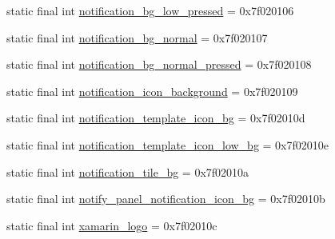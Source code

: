 \begin{CompactItemize}
\item 
static final int \hyperlink{classandroid_1_1support_1_1v7_1_1mediarouter_1_1_r_1_1drawable_5c6e82270631fb7b6baf29c77dc7ef75}{notification\_\-bg\_\-low\_\-pressed} = 0x7f020106
\item 
static final int \hyperlink{classandroid_1_1support_1_1v7_1_1mediarouter_1_1_r_1_1drawable_d57d0bc0bcd88fec47448c85cdb753ab}{notification\_\-bg\_\-normal} = 0x7f020107
\item 
static final int \hyperlink{classandroid_1_1support_1_1v7_1_1mediarouter_1_1_r_1_1drawable_435d86b92c03e14547fc0daf394d12ed}{notification\_\-bg\_\-normal\_\-pressed} = 0x7f020108
\item 
static final int \hyperlink{classandroid_1_1support_1_1v7_1_1mediarouter_1_1_r_1_1drawable_225aac73cb74ec1af9d6bedc6ebe6593}{notification\_\-icon\_\-background} = 0x7f020109
\item 
static final int \hyperlink{classandroid_1_1support_1_1v7_1_1mediarouter_1_1_r_1_1drawable_74a3e2f71bdf9bac41df261c9cd32bb2}{notification\_\-template\_\-icon\_\-bg} = 0x7f02010d
\item 
static final int \hyperlink{classandroid_1_1support_1_1v7_1_1mediarouter_1_1_r_1_1drawable_7d6760b5ac533c9250e56a8b9cf0c4f2}{notification\_\-template\_\-icon\_\-low\_\-bg} = 0x7f02010e
\item 
static final int \hyperlink{classandroid_1_1support_1_1v7_1_1mediarouter_1_1_r_1_1drawable_a4fca59b6663d59c49e67350080d4d14}{notification\_\-tile\_\-bg} = 0x7f02010a
\item 
static final int \hyperlink{classandroid_1_1support_1_1v7_1_1mediarouter_1_1_r_1_1drawable_a7f0ce0486a51e3a10622ae29db2d5b1}{notify\_\-panel\_\-notification\_\-icon\_\-bg} = 0x7f02010b
\item 
static final int \hyperlink{classandroid_1_1support_1_1v7_1_1mediarouter_1_1_r_1_1drawable_cee48ddbe73650a4cc9e528657ddebf6}{xamarin\_\-logo} = 0x7f02010c
\end{CompactItemize}


